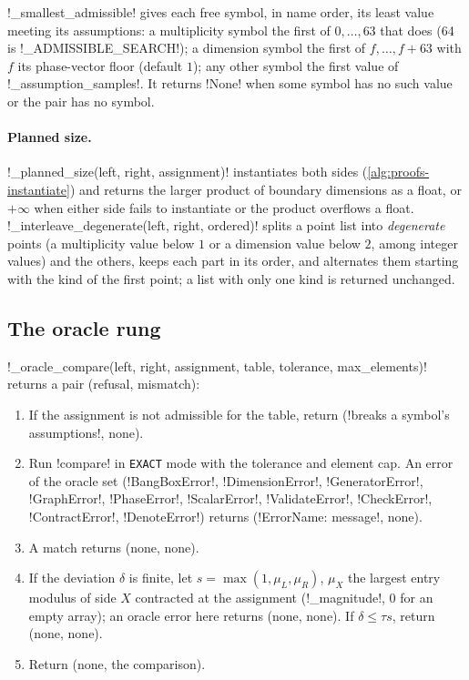 \py!_smallest_admissible! gives each free symbol, in name order, its least value meeting its assumptions: a multiplicity symbol the first of $0,\ldots,63$ that does (64 is \py!_ADMISSIBLE_SEARCH!); a dimension symbol the first of $f,\ldots,f+63$ with $f$ its phase-vector floor (default $1$); any other symbol the first value of \py!_assumption_samples!. It returns \py!None! when some symbol has no such value or the pair has no symbol.

\paragraph{Planned size.} \py!_planned_size(left, right, assignment)! instantiates both sides (\cref{alg:proofs-instantiate}) and returns the larger product of boundary dimensions as a float, or $+\infty$ when either side fails to instantiate or the product overflows a float. \py!_interleave_degenerate(left, right, ordered)! splits a point list into \emph{degenerate} points (a multiplicity value below $1$ or a dimension value below $2$, among integer values) and the others, keeps each part in its order, and alternates them starting with the kind of the first point; a list with only one kind is returned unchanged.

\subsection{The oracle rung}

\begin{algorithm}\label{alg:proofs-oracle-compare}
\py!_oracle_compare(left, right, assignment, table, tolerance, max_elements)! returns a pair (refusal, mismatch):
\begin{enumerate}
\item If the assignment is not admissible for the table, return (\code!breaks a symbol's assumptions!, none).
\item Run \py!compare! in \texttt{EXACT} mode with the tolerance and element cap. An error of the oracle set (\py!BangBoxError!, \py!DimensionError!, \py!GeneratorError!, \py!GraphError!, \py!PhaseError!, \py!ScalarError!, \py!ValidateError!, \py!CheckError!, \py!ContractError!, \py!DenoteError!) returns (\code!ErrorName: message!, none).
\item A match returns (none, none).
\item If the deviation $\delta$ is finite, let $s=\max(1,\mu_L,\mu_R)$, $\mu_X$ the largest entry modulus of side $X$ contracted at the assignment (\py!_magnitude!, $0$ for an empty array); an oracle error here returns (none, none). If $\delta\le\tau s$, return (none, none).
\item Return (none, the comparison).
\end{enumerate}
\end{algorithm}

